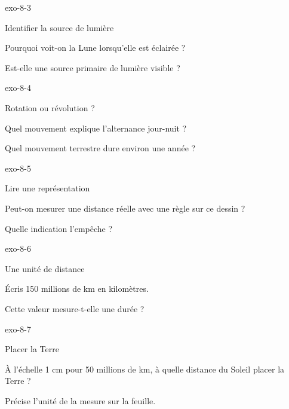 \documentclass[12pt,twoside,openany]{book}
\begin{document}
\begin{blocLivre}{exo-8-3}
\begin{exercice}[1]{Identifier la source de lumière}
\begin{questions}
\item Pourquoi voit-on la Lune lorsqu’elle est éclairée ?
\item Est-elle une source primaire de lumière visible ?
\end{questions}
\end{exercice}\end{blocLivre}
\begin{blocLivre}{exo-8-4}
\begin{exercice}[1]{Rotation ou révolution ?}
\begin{questions}
\item Quel mouvement explique l’alternance jour-nuit ?
\item Quel mouvement terrestre dure environ une année ?
\end{questions}
\end{exercice}\end{blocLivre}
\begin{blocLivre}{exo-8-5}
\begin{exercice}[1]{Lire une représentation}
\begin{questions}
\item Peut-on mesurer une distance réelle avec une règle sur ce dessin ?
\item Quelle indication l’empêche ?
\end{questions}
\end{exercice}\end{blocLivre}
\begin{blocLivre}{exo-8-6}
\begin{exercice}[2]{Une unité de distance}
\begin{questions}
\item Écris 150 millions de km en kilomètres.
\item Cette valeur mesure-t-elle une durée ?
\end{questions}
\end{exercice}\end{blocLivre}
\begin{blocLivre}{exo-8-7}
\begin{exercice}[2]{Placer la Terre}
\begin{questions}
\item À l’échelle 1 cm pour 50 millions de km, à quelle distance du Soleil placer la Terre ?
\item Précise l’unité de la mesure sur la feuille.
\end{questions}
\end{exercice}\end{blocLivre}
\end{document}
